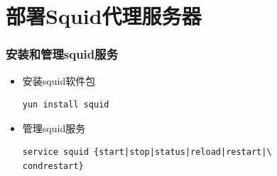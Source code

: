 \documentclass[xcolor=svgnames,presentation]{beamer}
\begin{document}
\section{部署Squid代理服务器}
\label{sec-4}
\begin{frame}[fragile]
\frametitle{安装和管理squid服务}
\label{sec-4-1}
\begin{itemize}

\item 安装squid软件包\\
\label{sec-4-1-1}%
\begin{verbatim}
yun install squid
\end{verbatim}

\item 管理squid服务\\
\label{sec-4-1-2}%
\begin{verbatim}
service squid {start|stop|status|reload|restart|\
condrestart}
\end{verbatim}
\end{itemize} %
\end{frame}
\end{document}
